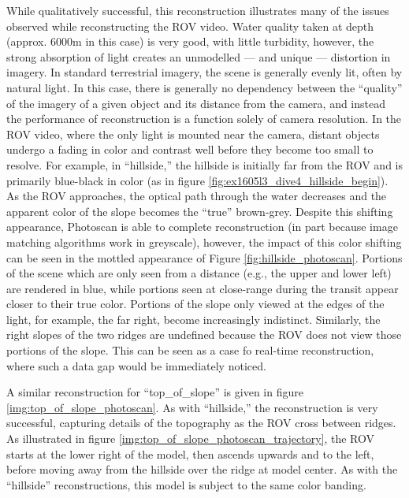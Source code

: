\documentclass[letterpaper,12pt]{article}
\begin{document}
While qualitatively successful, this reconstruction illustrates many of the issues observed while reconstructing the ROV video.    Water quality taken at depth (approx. 6000m in this case) is very good, with little turbidity, however, the strong absorption of light creates an unmodelled --- and unique --- distortion in imagery.   In standard terrestrial imagery, the scene is generally evenly lit, often by natural light.   In this case, there is generally no dependency between the ``quality'' of the imagery of a given object and its distance from the camera, and instead the performance of reconstruction is a function solely of camera resolution.   In the ROV video, where the only light is mounted near the camera, distant objects undergo a fading in color and contrast well before they become too small to resolve.   For example, in ``hillside,'' the hillside is initially far from the ROV and is primarily blue-black in color (as in figure \ref{fig:ex1605l3_dive4_hillside_begin}).  As the ROV approaches, the optical path through the water decreases and the apparent color of the slope becomes the ``true'' brown-grey.   Despite this shifting appearance, Photoscan is able to complete reconstruction (in part because image matching algorithms work in greyscale), however, the impact of this color shifting can be seen in the mottled appearance of Figure \ref{fig:hillside_photoscan}. 
Portions of the scene which are only seen from a distance (e.g., the upper and lower left) are rendered in blue, while portions seen at close-range during the transit appear closer to their true color.   Portions of the slope only viewed at the edges of the light, for example, the far right, become increasingly indistinct.  Similarly, the right slopes of the two ridges are undefined because the ROV does not view those portions of the slope.   This can be seen as a case fo real-time reconstruction, where such a data gap would be immediately noticed.

A similar reconstruction for ``top\_of\_slope'' is given in figure \ref{img:top_of_slope_photoscan}.  As with ``hillside,'' the reconstruction is very successful, capturing details of the topography as the ROV cross between ridges.   As illustrated in figure \ref{img:top_of_slope_photoscan_trajectory}, the ROV starts at the lower right of the model, then ascends upwards and to the left, before moving away from the hillside over the ridge at model center.  As with the ``hillside'' reconstructions, this model is subject to the same color banding.
\end{document}
